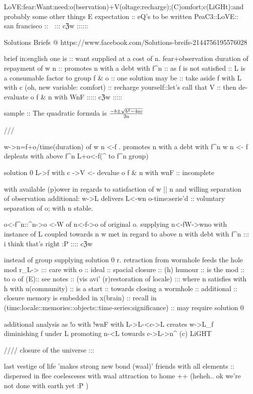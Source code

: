 LoVE:fear:Want:need:o(bservation)+V(oltage:recharge);(C)omfort;c(LiGHt):and probably some other things
E expectation :: eQ's to be written
PeaC3::LoVE:: san francisco :: 🌿 ::: cℨw ::::::

Solutions Briefs @ https://www.facebook.com/Solutions-breifs-2144756195576028


brief in:english one is :: want supplied at a cost of n. fear+observation duration of repayment of w n :: promotes n with a debt with f^n :: as f is not satisfied :: L is a consumable factor to {group} f & o :: one solution may be :: take aside f with L with c (oh, new variable: comfort) :: recharge yourself::let's call that V :: then de-evaluate o f & n with WnF ::::: cℨw :::::







sample :: The quadratic formula is $-b \pm \sqrt{b^2 - 4ac} \over 2a$
\bye

///

w->n=f+o/time(duration) of w n <-f . promotes n with a debt with f^n
w n <- f depleats with above f^n
L+o<-f(^ to f^n {group}) 

{solution 0}
L->f with c ->V <- devalue o f & n with wnF :: {incomplete}

with available (p)ower in regards to satisfaction of w || n and willing separation of observation
additional: w->L delivers L<-wn o-time:serie'd :: voluntary separation of o; with n stable.

o<-f^n::^n->o <-W of n<-f->o of original o.  supplying n<-fW->wno with instance of L coupled towards n w met in regard to above n with debt with f^n
::: i think that's right :P :::: cℨw

 instead of
{group} supplying {solution 0}
r. retraction from wormhole feeds the hole
mod r_L-> ::: care with o :: ideal :: spacial closure :: (h) humour :: is the mod :: to o of (E):: see notes :: (vis avi' (r)restoration of locale) ::: where n satisfies with h with u(community) :: is a start :: towards closing a wormhole :: additional :: closure memory is embedded in x(brain) :: recall in (time:locale::memories::objects::time-series:significance) :: may require {solution 0}

additional analysis as !o with !wnF with L->L-<c->L creates w->L_f diminishing f under L promoting n-<L towards c->L->n^{}
(c) LiGHT

////
closure of the universe ::: 

last vestige of life 'makes strong new bond (waal)' friends with all elements :: dispersed in flee coelesceses with waal attraction to home ++ (heheh.. ok we're not done with earth yet :P )


